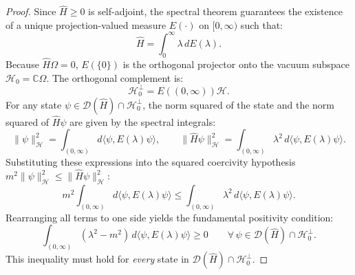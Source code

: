 \begin{proof}
Since $\hat{H} \ge 0$ is self-adjoint, the spectral theorem guarantees the existence of a unique projection-valued measure $E(\cdot)$ on $[0, \infty)$ such that:
\begin{equation}
\hat{H} = \int_0^\infty \lambda \, dE(\lambda).
\end{equation}
Because $\hat{H}\Omega = 0$, $E(\{0\})$ is the orthogonal projector onto the vacuum subspace $\mathcal{H}_0 = \mathbb{C}\Omega$. The orthogonal complement is:
\begin{equation}
\mathcal{H}_0^\perp = E((0, \infty)) \mathcal{H}.
\end{equation}
For any state $\psi \in \mathcal{D}(\hat{H}) \cap \mathcal{H}_0^\perp$, the norm squared of the state and the norm squared of $\hat{H}\psi$ are given by the spectral integrals:
\begin{equation}
\|\psi\|_{\mathcal{H}}^2 = \int_{(0, \infty)} d\langle \psi, E(\lambda) \psi \rangle, \qquad \|\hat{H} \psi\|_{\mathcal{H}}^2 = \int_{(0, \infty)} \lambda^2 \, d\langle \psi, E(\lambda) \psi \rangle.
\end{equation}
Substituting these expressions into the squared coercivity hypothesis $m^2 \|\psi\|_{\mathcal{H}}^2 \le \|\hat{H}\psi\|_{\mathcal{H}}^2$:
\begin{equation}
m^2 \int_{(0, \infty)} d\langle \psi, E(\lambda) \psi \rangle \le \int_{(0, \infty)} \lambda^2 \, d\langle \psi, E(\lambda) \psi \rangle.
\end{equation}
Rearranging all terms to one side yields the fundamental positivity condition:
\begin{equation}
\label{eq:spectral_integral_positivity}
\int_{(0, \infty)} (\lambda^2 - m^2) \, d\langle \psi, E(\lambda) \psi \rangle \ge 0 \qquad \forall \, \psi \in \mathcal{D}(\hat{H}) \cap \mathcal{H}_0^\perp.
\end{equation}
This inequality must hold for \emph{every} state in $\mathcal{D}(\hat{H}) \cap \mathcal{H}_0^\perp$.


\end{proof}
